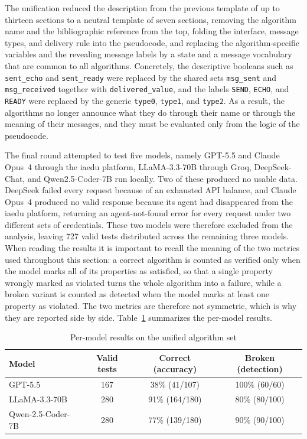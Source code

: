 The unification reduced the description from the previous template of up to thirteen sections to a neutral template of seven sections, removing the algorithm name and the bibliographic reference from the top, folding the interface, message types, and delivery rule into the pseudocode, and replacing the algorithm-specific variables and the revealing message labels by a state and a message vocabulary that are common to all algorithms. Concretely, the descriptive booleans such as \texttt{sent\_echo} and \texttt{sent\_ready} were replaced by the shared sets \texttt{msg\_sent} and \texttt{msg\_received} together with \texttt{delivered\_value}, and the labels \texttt{SEND}, \texttt{ECHO}, and \texttt{READY} were replaced by the generic \texttt{type0}, \texttt{type1}, and \texttt{type2}. As a result, the algorithms no longer announce what they do through their name or through the meaning of their messages, and they must be evaluated only from the logic of the pseudocode.

The final round attempted to test five models, namely GPT-5.5 and Claude Opus~4 through the iaedu platform, LLaMA-3.3-70B through Groq, DeepSeek-Chat, and Qwen2.5-Coder-7B run locally. Two of these produced no usable data. DeepSeek failed every request because of an exhausted API balance, and Claude Opus~4 produced no valid response because its agent had disappeared from the iaedu platform, returning an agent-not-found error for every request under two different sets of credentials. These two models were therefore excluded from the analysis, leaving 727 valid tests distributed across the remaining three models. When reading the results it is important to recall the meaning of the two metrics used throughout this section: a correct algorithm is counted as verified only when the model marks all of its properties as satisfied, so that a single property wrongly marked as violated turns the whole algorithm into a failure, while a broken variant is counted as detected when the model marks at least one property as violated. The two metrics are therefore not symmetric, which is why they are reported side by side. Table~\ref{tab:final-model} summarizes the per-model results.

\begin{table}[H]
\centering
\renewcommand{\arraystretch}{1.3}
\caption{Per-model results on the unified algorithm set}
\label{tab:final-model}
\begin{tabular}{|l|c|c|c|}
\hline
\textbf{Model} & \textbf{Valid tests} & \textbf{Correct (accuracy)} & \textbf{Broken (detection)} \\
\hline
GPT-5.5 & 167 & 38\% (41/107) & 100\% (60/60) \\
LLaMA-3.3-70B & 280 & 91\% (164/180) & 80\% (80/100) \\
Qwen-2.5-Coder-7B & 280 & 77\% (139/180) & 90\% (90/100) \\
\hline
\end{tabular}
\end{table}

